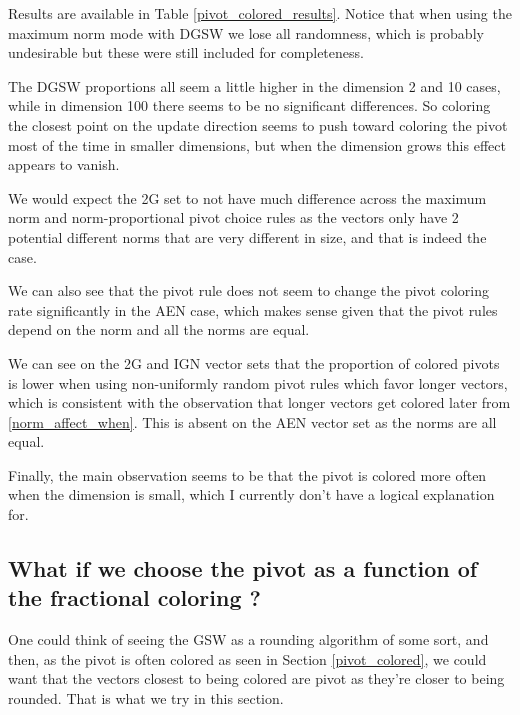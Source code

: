 \documentclass[12pt]{article}
\begin{document}
Results are available in Table \ref{pivot_colored_results}. Notice that when using the maximum norm mode with DGSW we lose all randomness, which is probably undesirable but these were still included for completeness.

The DGSW proportions all seem a little higher in the dimension 2 and 10 cases, while in dimension 100 there seems to be no significant differences. So coloring the closest point on the update direction seems to push toward coloring the pivot most of the time in smaller dimensions, but when the dimension grows this effect appears to vanish.

We would expect the 2G set to not have much difference across the maximum norm and norm-proportional pivot choice rules as the vectors only have 2 potential different norms that are very different in size, and that is indeed the case.

We can also see that the pivot rule does not seem to change the pivot coloring rate significantly in the AEN case, which makes sense given that the pivot rules depend on the norm and all the norms are equal.

We can see on the 2G and IGN vector sets that the proportion of colored pivots is lower when using non-uniformly random pivot rules which favor longer vectors, which is consistent with the observation that longer vectors get colored later from \ref{norm_affect_when}. This is absent on the AEN vector set as the norms are all equal.

Finally, the main observation seems to be that the pivot is colored more often when the dimension is small, which I currently don't have a logical explanation for.

\subsection{What if we choose the pivot as a function of the fractional coloring ?}\label{pivot_coloring_rules}
One could think of seeing the GSW as a rounding algorithm of some sort, and then, as the pivot is often colored as seen in Section \ref{pivot_colored}, we could want that the vectors closest to being colored are pivot as they're closer to being rounded. That is what we try in this section.%
\end{document}
